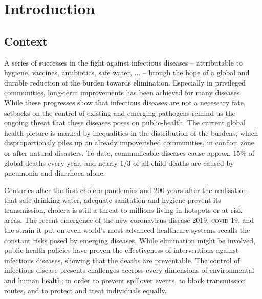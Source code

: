 \chapter*{Introduction} %
 \section{Context}
A series of successes in the fight against infectious diseases -- attributable to \eg hygiene, vaccines, antibiotics, safe water, ... -- brough the hope of a global and durable reduction of the burden towards elimination. Especially in privileged communities, long-term improvements has been achieved for many diseases. While these progresses show that infectious diseases are not a necessary fate, setbacks on the control of existing and emerging pathogens remind us the ongoing threat that these diseases poses on public-health. The current global health picture is marked by inequalities in the distribution of the burdens, which disproportionaly piles up on already impoverished communities, in conflict zone or after natural disasters. To date, communicable diseases cause approx. 15\% of global deaths every year\cite[][Table 1, excl. non-transmissible neonatal and maternal diseases and nutritional diseases; pre-\textsc{covid}-19 estimates]{Roth:GlobalRegionalNational:2018}, and nearly 1/3 of all child deaths are caused by pneumonia and diarrhoea alone\cite[][\textsc{M} deaths among under 5, every year.]{WHO:EndingPreventableChild:2013}.
 
 Centuries after the first cholera pandemics and 200 years after the realisation that safe drinking-water, adequate sanitation and hygiene prevent its transmission, cholera is still a threat to millions living in hotspots or at risk areas. The recent emergence of the new coronavirus disease 2019, \textsc{covid}-19, and the strain it put on even world's most advanced healthcare systems recalls the constant risks posed by emerging diseases. 
While elimination might be involved, public-health policies have proven the effectiveness of interventions against infectious diseases, showing that the deaths are preventable. The control of infectious disease presents challenges accross every dimensions of environmental and human health; in order to prevent spillover events, to block transmission routes, and to protect and treat individuals equally. 

